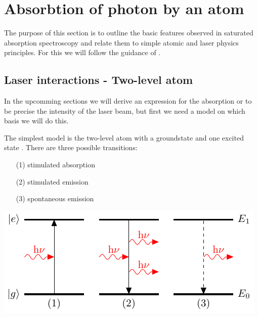 
\chapter{Absorbtion of photon by an atom}  %
The purpose of this section is to outline the basic features observed in saturated absorption
spectroscopy and relate them to simple atomic and laser physics principles.
For this we will follow the guidance of \citep{SAS}.

\ifpdf{}
    \graphicspath{{Chapter2/Figs/Raster/}{Chapter2/Figs/PDF/}{Chapter2/Figs/}}
\else
    \graphicspath{{Chapter2/Figs/Vector/}{Chapter2/Figs/}}
\fi



\section{Laser interactions - Two-level atom} %

In the upcomming sections we will derive an expression for the absorption or to be precise the
intensity of the laser beam, but first we need a model on which basis we will do this.
\bigskip

The simplest model is the two-level atom with a groundstate  and one excited state . There are three
possible transitions:
\bigskip

\begin{minipage}[c][][c]{.35\textwidth}
\begin{itemize}
\item[(1)] stimulated absorption
\item[(2)] stimulated emission
\item[(3)] spontaneous emission
\end{itemize}
\end{minipage}
\hfill
\begin{minipage}[c]{.55\textwidth}
\includegraphics[width=\textwidth]{twolevel}
\end{minipage}
\bigskip

